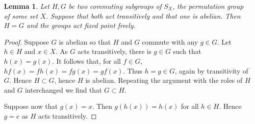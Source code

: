 \documentclass[12pt]{amsart}
\newtheorem{lemma}[theorem]{Lemma}
\theoremstyle{definition}
\numberwithin{equation}{section}
\begin{document}
\begin{lemma}\label{lem-ls}
Let $H,G$ be two commuting subgroups of $S_X$, the permutation group of some set $X$. Suppose that both act transitively and that one is abelian. Then $H=G$ and the groups act fixed point freely.
\end{lemma}
\begin{proof}
Suppose $G$ is abelian so that $H$ and $G$ commute with any $g\in G$. Let $h\in H$ and $x\in X$. As $G$ acts transitively, there is $g\in G$ such that $h(x) = g(x)$. It follows that, for all $f\in G$,
$hf(x)=fh(x) = fg(x) =gf(x)$. Thus $h=g\in G$, again by transitivity of $G$. 
Hence $H\subset G$, hence $H$ is abelian. Repeating the argument with the roles of $H$ and $G$ interchanged we find that $G\subset H$. 

Suppose now that $g(x)=x$. Then $g(h(x))=h(x)$ for all $h\in H$. Hence $g=e$ as $H$ acts transitively. 
\end{proof}


\end{document}
